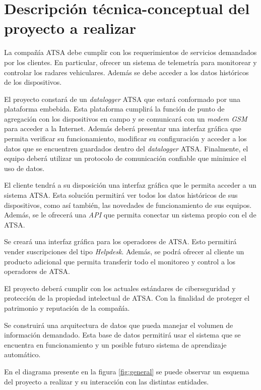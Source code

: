 \documentclass[
12pt,
spanish,
singlespacing,
parskip,
headsepline,]{article}
\begin{document}
\section{Descripción técnica-conceptual del proyecto a realizar}

La compañía ATSA debe cumplir con los requerimientos de servicios demandados por los clientes.
En particular, ofrecer un sistema de telemetría para monitorear y controlar los radares vehiculares.
Además se debe acceder a los datos históricos de los dispositivos.

El proyecto constará de un \emph{datalogger} ATSA que estará conformado por una plataforma embebida.
Esta plataforma cumplirá la función de punto de agregación con los dispositivos en campo y se comunicará con un \emph{modem GSM} para acceder a la Internet.
Además deberá presentar una interfaz gráfica que permita verificar su funcionamiento, modificar su configuración y acceder a los datos que se encuentren guardados dentro del \emph{datalogger} ATSA.
Finalmente, el equipo deberá utilizar un protocolo de comunicación confiable que minimice el uso de datos.

El cliente tendrá a su disposición una interfaz gráfica que le permita acceder a un sistema ATSA.
Esta solución permitirá ver todos los datos históricos de sus dispositivos, como así también, las novedades de funcionamiento de sus equipos.
Además, se le ofrecerá una \emph{API} que permita conectar un sistema propio con el de ATSA.

Se creará una interfaz gráfica para los operadores de ATSA.
Esto permitirá vender suscripciones del tipo \emph{Helpdesk}.
Además, se podrá ofrecer al cliente un producto adicional que permita transferir todo el monitoreo y control a los operadores de ATSA.

El proyecto deberá cumplir con los actuales estándares de ciberseguridad y protección de la propiedad intelectual de ATSA.
Con la finalidad de proteger el patrimonio y reputación de la compañía.

Se construirá una arquitectura de datos que pueda manejar el volumen de información demandado. Esta base de datos permitirá usar el sistema que se encuentra en funcionamiento y un posible futuro sistema de aprendizaje automático.

En el diagrama presente en la figura \ref{fig:general} se puede observar un esquema del proyecto a realizar y su interacción con las distintas entidades.
\end{document}
